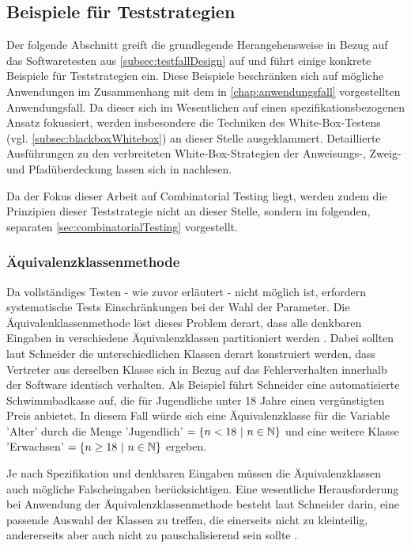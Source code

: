 \subsection{Beispiele für Teststrategien}\label{subsec:beispieleTests}

Der folgende Abschnitt greift die grundlegende Herangehensweise in Bezug auf das Softwaretesten aus \autoref{subsec:testfallDesign} auf und führt einige konkrete Beispiele für Teststrategien ein. Diese Beispiele beschränken sich auf mögliche Anwendungen im Zusammenhang mit dem in \autoref{chap:anwendungsfall} vorgestellten Anwendungsfall. Da dieser sich im Wesentlichen auf einen spezifikationsbezogenen Ansatz fokussiert, werden insbesondere die Techniken des White-Box-Testens (vgl. \autoref{subsec:blackboxWhitebox}) an dieser Stelle ausgeklammert. Detaillierte Ausführungen zu den verbreiteten White-Box-Strategien der Anweisungs-, Zweig- und Pfadüberdeckung lassen sich in \cite[S. 108 ff.]{schneider2012abenteuer} nachlesen.

Da der Fokus dieser Arbeit auf Combinatorial Testing liegt, werden zudem die Prinzipien dieser Teststrategie nicht an dieser Stelle, sondern im folgenden, separaten \autoref{sec:combinatorialTesting} vorgestellt.

\subsubsection{Äquivalenzklassenmethode}

Da vollständiges Testen - wie zuvor erläutert - nicht möglich ist, erfordern systematische Tests Einschränkungen bei der Wahl der Parameter. Die Äquivalenklassenmethode löst dieses Problem derart, dass alle denkbaren Eingaben in verschiedene Äquivalenzklassen partitioniert werden \cite[S. 94]{schneider2012abenteuer}. Dabei sollten laut Schneider \cite[S. 94 ff.]{schneider2012abenteuer} die unterschiedlichen Klassen derart konstruiert werden, dass Vertreter aus derselben Klasse sich in Bezug auf das Fehlerverhalten innerhalb der Software identisch verhalten. Als Beispiel führt Schneider eine automatisierte Schwimmbadkasse auf, die für Jugendliche unter 18 Jahre einen vergünstigten Preis anbietet. In diesem Fall würde sich eine Äquivalenzklasse für die Variable 'Alter' durch die Menge 'Jugendlich' $= \{n < 18 ~ | ~ n \in \mathbb{N}\}$ und eine weitere Klasse 'Erwachsen' $= \{n \geq 18 ~ | ~ n \in \mathbb{N}\}$ ergeben. 

Je nach Spezifikation und denkbaren Eingaben müssen die Äquivalenzklassen auch mögliche Falscheingaben berücksichtigen. Eine wesentliche Herausforderung bei Anwendung der Äquivalenzklassenmethode besteht laut Schneider darin, eine passende Auswahl der Klassen zu treffen, die einerseits nicht zu kleinteilig, andererseits aber auch nicht zu pauschalisierend sein sollte \cite[S. 95]{schneider2012abenteuer}.

